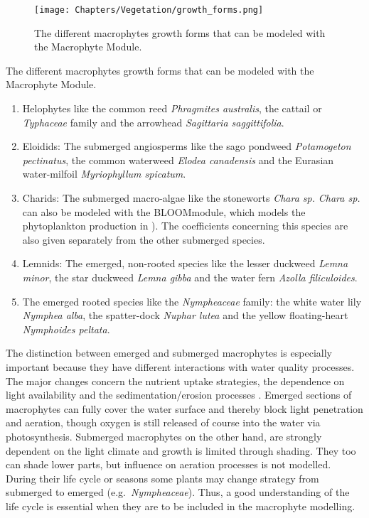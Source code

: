 \begin{figure}[H]
\texttt{[image: Chapters/Vegetation/growth\_forms.png]}
\caption{The different macrophytes growth forms that can be modeled with the Macrophyte Module.
}
\label{fig:growthForms}
\end{figure}

The different macrophytes growth forms that can be modeled with the Macrophyte Module.
\begin{enumerate}
\item
Helophytes like the common reed \emph{Phragmites australis}, the cattail or \emph{Typhaceae} family and the arrowhead \emph{Sagittaria saggittifolia}.
\item
Eloidids: The submerged angiosperms like the sago pondweed \emph{Potamogeton pectinatus}, the common
waterweed \emph{Elodea canadensis} and the Eurasian water-milfoil \emph{Myriophyllum spicatum}.
\item
Charids: The submerged macro-algae like the stoneworts \emph{Chara sp.} \emph{Chara sp.} can also
be modeled with the BLOOMmodule, which models the phytoplankton production in \DWAQ).  The coefficients
concerning this species are also given separately from the other submerged species.
\item
Lemnids: The emerged, non-rooted species like the lesser duckweed \emph{Lemna minor}, the star duckweed
\emph{Lemna gibba} and the water fern \emph{Azolla filiculoides}.
\item
The emerged rooted species like the \emph{Nympheaceae} family: the white water
lily \emph{Nymphea alba}, the spatter-dock \emph{Nuphar lutea} and the yellow floating-heart \emph{Nymphoides peltata}.
\end{enumerate}

The distinction between emerged and submerged macrophytes is especially important because they have different
interactions with water quality processes. The major changes concern the nutrient uptake strategies, the
dependence on light availability and the sedimentation/erosion processes
\citep{RiversHandbook,BarkoSmart,EcologyRivers}.
Emerged sections of macrophytes can fully cover the water surface and thereby block light penetration and
aeration, though oxygen is still released of course into the water via photosynthesis. Submerged macrophytes on the
other hand, are strongly dependent on the light climate and growth
is limited through shading. They too can shade lower parts, but influence on aeration processes is not modelled.
During their life cycle or seasons some plants may change strategy from submerged to emerged (e.g.\ \emph{Nympheaceae}).
Thus, a good understanding of the life cycle is essential when they are to be included in the macrophyte modelling.

